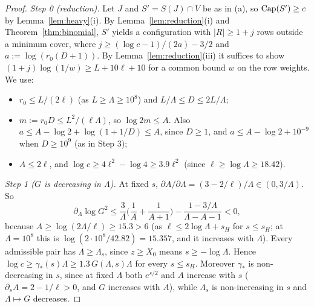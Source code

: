 \begin{proof}
\emph{Step 0 (reduction).} Let $J$ and $S'=S(J)\cap V$ be as in (a), so $\operatorname{Cap}(S')\ge c$ by Lemma~\ref{lem:heavy}(i). By
Lemma~\ref{lem:reduction}(i) and Theorem~\ref{thm:binomial}, $S'$ yields a configuration with $|R|\ge1+j$ rows outside a minimum cover, where $j\ge(\log c-1)/(2a)-3/2$ and
$a:=\log(r_0(D+1))$. By Lemma~\ref{lem:reduction}(iii) it suffices to show $(1+j)\log(1/w)\ge L+10\ell+10$ for a common bound $w$
on the row weights. We use:
\begin{itemize}
\item $r_0\le L/(2\ell)$ (as $L\ge\Lambda\ge10^8$) and $L/\Lambda\le D\le2L/\Lambda$;
\item $m:=r_0D\le L^2/(\ell\Lambda)$, so $\log2m\le A$. Also $a\le A-\log2+\log(1+1/D)\le A$, since $D\ge1$, and
  $a\le A-\log2+10^{-9}$ when $D\ge10^9$ (as in Step 3);
\item $A\le2\ell$, and $\log c\ge4\ell^2-\log4\ge3.9\ell^2$ (since $\ell\ge\log\Lambda\ge18.42$).
\end{itemize}

\emph{Step 1 ($G$ is decreasing in $\Lambda$).} At fixed $s$, $\partial A/\partial\Lambda=(3-2/\ell)/\Lambda\in(0,3/\Lambda)$.
So
\[
\partial_\Lambda\log G^2\le\frac3\Lambda\Big(\frac1A+\frac1{A+1}\Big)-\frac{1-3/\Lambda}{\Lambda-A-1}<0,
\]
because $A\ge\log(2\Lambda/\ell)\ge15.3>6$ (as $\ell\le2\log\Lambda+s_H$ for $s\le s_H$; at $\Lambda=10^8$ this is
$\log(2\cdot10^8/42.82)=15.357$, and it increases with $\Lambda$). Every admissible pair has $\Lambda\ge\Lambda_s$, since $z\ge X_0$ means
$s\ge-\log\Lambda$. Hence $\log c\ge\gamma_*(s)\Lambda\ge1.3\,G(\Lambda,s)\Lambda$ for every $s\le s_H$. Moreover $\gamma_*$
is non-decreasing in $s$, since at fixed $\Lambda$ both $e^{s/2}$ and $A$ increase with $s$ ($\partial_sA=2-1/\ell>0$, and $G$ increases with
$A$), while $\Lambda_s$ is non-increasing in $s$ and $\Lambda\mapsto G$ decreases.


\end{proof}
